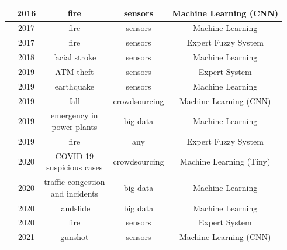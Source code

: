 \begin{refsection}
\begin{table}
{\begin{tabular}{c|c|c|c|c}
    \hline
    \citeauthor{CNNFireVideo} & 2016 & fire & sensors & Machine Learning (CNN) \\
    
    \hline
    \citeauthor{SultanMahmud2017} & 2017 & fire & sensors & Machine Learning \\
    
    \hline
    \citeauthor{FuzzyFire2} & 2017 & fire & sensors & Expert Fuzzy System \\
    
    \hline
    \citeauthor{MachineFacialStroke} & 2018 & facial stroke & sensors & Machine Learning \\
    
    \hline
    \citeauthor{ExpertATM1} & 2019 & ATM theft & sensors & Expert System \\
    
    \hline
    \citeauthor{Chin:2019} & 2019 & earthquake & sensors & Machine Learning \\
    
    \hline
    \citeauthor{cnn1} & 2019 & fall & crowdsourcing & Machine Learning (CNN) \\
    
    \hline
    \citeauthor{machine1} & 2019 & \makecell{emergency in\\power plants} & big data & Machine Learning \\

    \hline
    \citeauthor{ExpertFire2} & 2019 & fire & any & Expert Fuzzy System \\
    
    \hline
    \citeauthor{TinyMachineCovid} & 2020 & \makecell{COVID-19\\suspicious cases} & crowdsourcing & Machine Learning (Tiny) \\
    
    \hline
    \citeauthor{machine2} & 2020 & \makecell{traffic congestion\\and incidents} & big data & Machine Learning \\
    
    \hline
    \citeauthor{BRAGAGNOLO2020104240} & 2020 & landslide & big data & Machine Learning \\
    
    \hline
    \citeauthor{ExpertFire1} & 2020 & fire & sensors & Expert System \\
    
    \hline
    \citeauthor{cnn2} & 2021 & gunshot & sensors & Machine Learning (CNN) \\
    

\end{tabular}}
\end{table}
\end{refsection}
